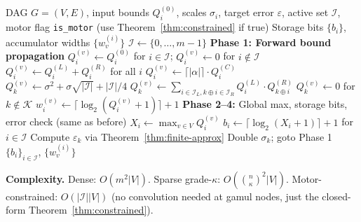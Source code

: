 \documentclass[11pt,a4paper]{article}
\theoremstyle{definition}
\theoremstyle{plain}
\theoremstyle{remark}
\begin{document}
\begin{algorithm}[H]
\caption{Optimal Bit Allocation for L-Rep (Dense and Sparse, with Motor Constraint)}
\label{alg:bitalloc}
\begin{algorithmic}[1]
\REQUIRE DAG $G=(V,E)$, input bounds $Q_i^{(0)}$, scales $\sigma_i$,
         target error $\varepsilon$, active set $\mathcal{I}$,
         motor flag \texttt{is\_motor} (use Theorem~\ref{thm:constrained} if true)
\ENSURE Storage bits $\{b_i\}$, accumulator widths $\{w_v^{(i)}\}$
 $\mathcal{I}\leftarrow\{0,\ldots,m-1\}$ \ENDIF
\STATE \textbf{Phase 1: Forward bound propagation}
    \STATE $Q_i^{(v)}\leftarrow Q_i^{(0)}$ for $i\in\mathcal{I}$;
           $Q_i^{(v)}\leftarrow0$ for $i\notin\mathcal{I}$
    \STATE $Q_i^{(v)}\leftarrow Q_i^{(L)}+Q_i^{(R)}$ for all $i$
    \STATE $Q_i^{(v)}\leftarrow\lceil|\alpha|\rceil\cdot Q_i^{(C)}$
        \STATE $Q_k^{(v)}\leftarrow\sigma^2+\sigma\sqrt{|\mathcal{I}|}+|\mathcal{I}|/4$
      \ENDFOR
    \ELSE
        \STATE $Q_k^{(v)}\leftarrow\sum_{i\in\mathcal{I}_L,k\oplus i\in\mathcal{I}_R}Q_i^{(L)}\cdot Q_{k\oplus i}^{(R)}$
      \ENDFOR
    \ENDIF
    \STATE $Q_k^{(v)}\leftarrow0$ for $k\notin\mathcal{K}$
  \ENDIF
  \STATE $w_i^{(v)}\leftarrow\lceil\log_2(Q_i^{(v)}+1)\rceil+1$
\ENDFOR
\STATE \textbf{Phase 2--4:} Global max, storage bits, error check (same as before)
\STATE $X_i\leftarrow\max_{v\in V}Q_i^{(v)}$
\STATE $b_i\leftarrow\lceil\log_2(X_i+1)\rceil+1$ for $i\in\mathcal{I}$
\STATE Compute $\varepsilon_k$ via Theorem~\ref{thm:finite-approx}
  \STATE Double $\sigma_k$; goto Phase 1
\ENDIF
\RETURN $\{b_i\}_{i\in\mathcal{I}}$, $\{w_v^{(i)}\}$
\end{algorithmic}
\end{algorithm}

\textbf{Complexity.}
Dense: $O(m^2|V|)$.
Sparse grade-$\kappa$: $O(\binom{n}{\kappa}^2|V|)$.
Motor-constrained: $O(|\mathcal{I}||V|)$ (no convolution needed at
gamul nodes, just the closed-form Theorem~\ref{thm:constrained}).
\end{document}

